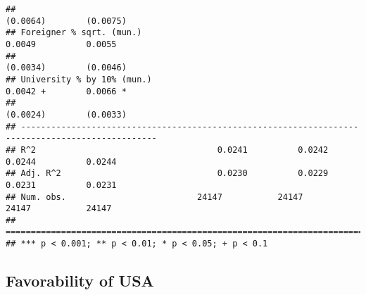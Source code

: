 \documentclass[
]{article}
\begin{document}
\begin{verbatim}
##                                                                       (0.0064)        (0.0075)   
## Foreigner % sqrt. (mun.)                                               0.0049          0.0055    
##                                                                       (0.0034)        (0.0046)   
## University % by 10% (mun.)                                             0.0042 +        0.0066 *  
##                                                                       (0.0024)        (0.0033)   
## -------------------------------------------------------------------------------------------------
## R^2                                    0.0241          0.0242          0.0244          0.0244    
## Adj. R^2                               0.0230          0.0229          0.0231          0.0231    
## Num. obs.                          24147           24147           24147           24147         
## =================================================================================================
## *** p < 0.001; ** p < 0.01; * p < 0.05; + p < 0.1
\end{verbatim}

\hypertarget{favorability-of-usa}{%
\subsection{Favorability of USA}\label{favorability-of-usa}}
\end{document}
